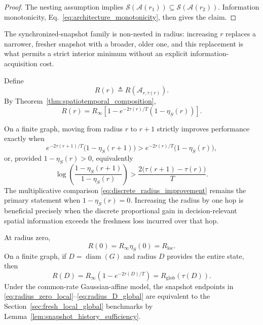 \documentclass[11pt]{article}
\begin{document}
\begin{proof}
The nesting assumption implies
$\mathcal S(\mathcal A(r_1))\subseteq\mathcal S(\mathcal A(r_2))$.
Information monotonicity, Eq.~\eqref{eq:architecture_monotonicity}, then gives
the claim.
\end{proof}

The synchronized-snapshot family is non-nested in radius: increasing $r$
replaces a narrower, fresher snapshot with a broader, older one, and this
replacement is what permits a strict interior minimum without an explicit
information-acquisition cost.

Define
\begin{equation}
    R(r)
    \triangleq
    R
    \left(
        \mathcal{A}_{r,\tau(r)}
    \right).
    \label{eq:R_of_r}
\end{equation}
By Theorem~\ref{thm:spatiotemporal_composition},
\begin{equation}
    \boxed{
    R(r)
    =
    R_\infty
    \left[
        1
        -
        e^{-2\tau(r)/T}
        \left(
            1-\eta_S(r)
        \right)
    \right].
    }
    \label{eq:radius_regret_master}
\end{equation}

On a finite graph, moving from radius $r$ to $r+1$ strictly improves
performance exactly when
\begin{equation}
e^{-2\tau(r+1)/T}\bigl(1-\eta_S(r+1)\bigr)
>
e^{-2\tau(r)/T}\bigl(1-\eta_S(r)\bigr),
\label{eq:discrete_radius_improvement}
\end{equation}
or, provided $1-\eta_S(r)>0$, equivalently
\begin{equation}
\log\!\left(
\frac{1-\eta_S(r+1)}{1-\eta_S(r)}
\right)
>
\frac{2\bigl(\tau(r+1)-\tau(r)\bigr)}{T}.
\label{eq:discrete_radius_log_improvement}
\end{equation}
The multiplicative comparison \eqref{eq:discrete_radius_improvement} remains
the primary statement when $1-\eta_S(r)=0$. Increasing the radius by one hop is
beneficial precisely when the discrete
proportional gain in decision-relevant spatial information exceeds the
freshness loss incurred over that hop.

At radius zero,
\begin{equation}
    R(0)
    =
    R_\infty\eta_S(0)
    =
    R_{\mathrm{loc}}.
    \label{eq:radius_zero_local}
\end{equation}
On a finite graph, if $D=\operatorname{diam}(G)$ and radius $D$ provides the
entire state, then
\begin{equation}
    R(D)
    =
    R_\infty
    \left(
        1-e^{-2\tau(D)/T}
    \right)
    =
    R_{\mathrm{glob}}(\tau(D)).
    \label{eq:radius_D_global}
\end{equation}
Under the common-rate Gaussian-affine model, the snapshot endpoints in
\eqref{eq:radius_zero_local}--\eqref{eq:radius_D_global} are equivalent to the
Section~\ref{sec:fresh_local_global} benchmarks by
Lemma~\ref{lem:snapshot_history_sufficiency}.
\end{document}
